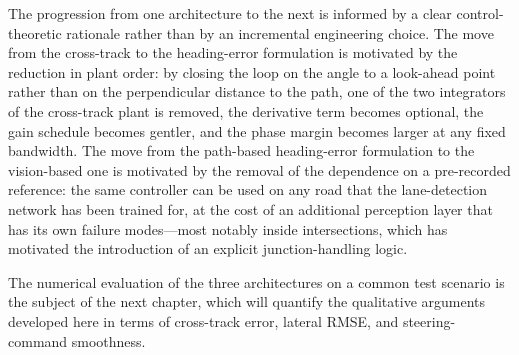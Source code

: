 The progression from one architecture to the next is informed by a clear control-theoretic rationale rather than by an incremental engineering choice. The move from the cross-track to the heading-error formulation is motivated by the reduction in plant order: by closing the loop on the angle to a look-ahead point rather than on the perpendicular distance to the path, one of the two integrators of the cross-track plant is removed, the derivative term becomes optional, the gain schedule becomes gentler, and the phase margin becomes larger at any fixed bandwidth. The move from the path-based heading-error formulation to the vision-based one is motivated by the removal of the dependence on a pre-recorded reference: the same controller can be used on any road that the lane-detection network has been trained for, at the cost of an additional perception layer that has its own failure modes---most notably inside intersections, which has motivated the introduction of an explicit junction-handling logic.

The numerical evaluation of the three architectures on a common test scenario is the subject of the next chapter, which will quantify the qualitative arguments developed here in terms of cross-track error, lateral \ac{RMSE}, and steering-command smoothness.
